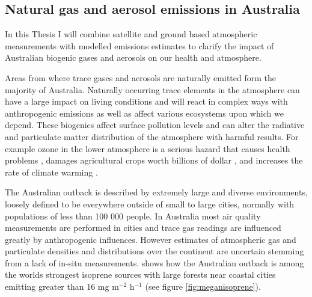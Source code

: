 \subsection{Natural gas and aerosol emissions in Australia}

In this Thesis I will combine satellite and ground based atmospheric measurements with modelled emissions estimates to clarify the impact of Australian biogenic gases and aerosols on our health and atmosphere.

Areas from where trace gases and aerosols are naturally emitted form the majority of Australia.
Naturally occurring trace elements in the atmosphere can have a large impact on living conditions and will react in complex ways with anthropogenic emissions as well as affect various ecosystems upon which we depend.
These biogenics affect surface pollution levels and can alter the radiative and particulate matter distribution of the atmosphere with harmful results.
For example ozone in the lower atmosphere is a serious hazard that causes health problems \cite{Hsieh_2013}, damages agricultural crops worth billions of dollar \cite{Avnery_2011}, and increases the rate of climate warming \cite{IPCC_2013_chap8}.

The Australian outback is described by extremely large and diverse environments, loosely defined to be everywhere outside of small to large cities, normally with populations of less than 100 000 people.
In Australia most air quality measurements are performed in cities and trace gas readings are influenced greatly by anthropogenic influences.
However estimates of atmospheric gas and particulate densities and distributions over the continent are uncertain stemming from a lack of in-situ measurements.
\citet{Guenther_2006} shows how the Australian outback is among the worlds strongest isoprene sources with large forests near coastal cities emitting greater than 16 mg m$^{-2}$ h$^{-1}$ (see figure \ref{fig:meganisoprene}).

  